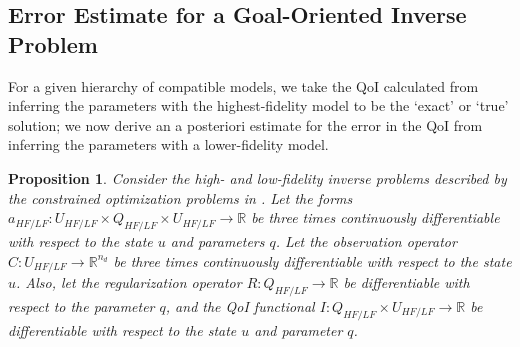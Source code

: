 \documentclass[review,sort&compress]{elsarticle}
\newcommand{\Reals}{{\mathbb{R}}}
\newtheorem{proposition}{Proposition}
\providecommand{\DIFaddtex}[1]{{\protect\color{blue} \sf #1}} %
\providecommand{\DIFaddbegin}{} %
\providecommand{\DIFaddend}{} %
\providecommand{\DIFadd}[1]{\texorpdfstring{\DIFaddtex{#1}}{#1}} %
\newcommand{\DIFaddincludegraphics}[2][]{{\color{blue}\fbox{\DIFOincludegraphics[#1]{#2}}}} %
\DeclareRobustCommand{\DIFaddbegin}{\DIFOaddbegin \let\includegraphics\DIFaddincludegraphics} %
\DeclareRobustCommand{\DIFaddend}{\DIFOaddend \let\includegraphics\DIFOincludegraphics} %
\begin{document}
\subsection[Error Estimate for a Goal-Oriented Inverse Problem]{Error Estimate for a Goal-Oriented Inverse Problem}  \label{sec:deriv}
%
For a given hierarchy of \DIFaddbegin \DIFadd{compatible }\DIFaddend models, we take the QoI calculated from inferring the parameters with the highest-fidelity model to be the `exact' or `true' solution; we now derive an a posteriori estimate for the error in the QoI from inferring the parameters with a lower-fidelity model.
%
\begin{proposition}
\label{thm:error_estimate}
Consider the high- and low-fidelity inverse problems described by the constrained optimization problems in . Let the forms $a_{HF/LF}:U_{HF/LF} \times Q_{HF/LF} \times U_{HF/LF} \to \Reals$ be three times continuously differentiable with respect to the state $u$ and parameters $q$. Let the observation operator $C:U_{HF/LF}\to\Reals^{n_d}$ be three times continuously differentiable with respect to the state $u$. Also, let the regularization operator $R:Q_{HF/LF}\to\Reals$ be differentiable with respect to the parameter $q$, and the QoI functional $I:Q_{HF/LF}\times U_{HF/LF}\to\Reals$ be differentiable with respect to the state $u$ and parameter $q$.


\end{proposition}
\end{document}
